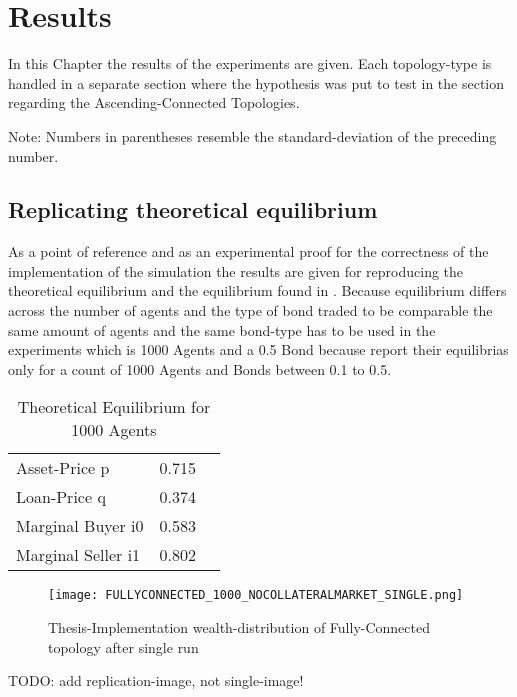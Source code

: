 \documentclass[Bachelorarbeit.tex]{subfiles}
\begin{document}
\graphicspath{{./figures/results/}}	%

\chapter{Results}

In this Chapter the results of the experiments are given. Each topology-type is handled in a separate section where the hypothesis was put to test in the section regarding the Ascending-Connected Topologies.

Note: Numbers in parentheses resemble the standard-deviation of the preceding number.

\section{Replicating theoretical equilibrium}
As  a point of reference and as an experimental proof for the correctness of the implementation of the simulation the results are given for reproducing the theoretical equilibrium and the equilibrium found in \cite{Breuer2015}.
Because equilibrium differs across the number of agents and the type of bond traded to be comparable the same amount of agents and the same bond-type has to be used in the experiments which is 1000 Agents and a 0.5 Bond because \cite{Breuer2015} report their equilibrias only for a count of 1000 Agents and Bonds between 0.1 to 0.5.

\begin{table}[h]
	\centering
	\caption{Theoretical Equilibrium for 1000 Agents}
	\begin{tabular} { l c r }
		\hline
		Asset-Price p & 0.715 \\
		Loan-Price q & 0.374 \\
		Marginal Buyer i0 & 0.583 \\
		Marginal Seller i1 & 0.802 \\
		\hline
	\end{tabular}
\end{table}


\begin{figure}[!htbp]
	\centering
  \texttt{[image: FULLYCONNECTED\_1000\_NOCOLLATERALMARKET\_SINGLE.png]}
	\caption{Thesis-Implementation wealth-distribution of Fully-Connected topology after single run}
	\label{fig1}
\end{figure}

TODO: add replication-image, not single-image!
\end{document}
